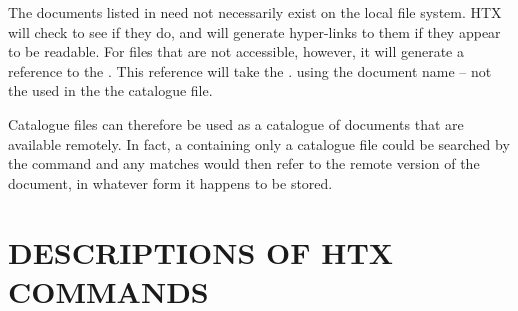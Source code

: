 The documents listed in   need not necessarily exist on the local
file system. HTX will check to see if they do, and will generate
hyper-links to them if they appear to be readable. For files that are
not accessible, however, it will generate a reference to the
.
This reference will
take the 
\latex{(\S\ref{sect:specifyingaserver})}.
using the document name -- not the  used in the the catalogue file.

Catalogue files can therefore be used as a
 catalogue of
documents that are available remotely. In fact, a  containing only a catalogue file
could be searched by the  command and any
matches would then refer to the remote version of the document, in
whatever form it happens to be stored.

\newpage
\appendix
\section{\label{sect:commanddescriptions}DESCRIPTIONS OF HTX COMMANDS}

